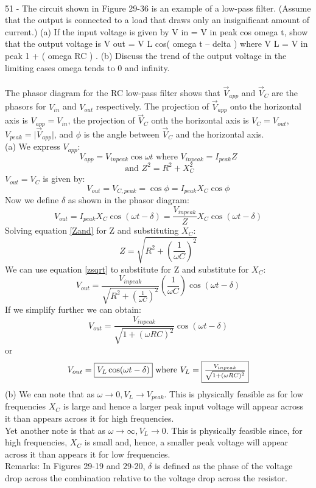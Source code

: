 \documentclass{report}
\begin{document}
\paragraph{}
51 - The circuit shown in Figure 29-36 is an example of a low-pass filter. (Assume that the output is connected to a load that draws only an insignificant amount of current.) (a) If the input voltage is given by V in = V in peak cos omega t, show that the output voltage is V out = V L cos( omega t – delta ) where V L = V in peak 1 + ( omega RC ) . (b) Discuss the trend of the output voltage in the limiting cases omega tends to 0 and infinity.\\
\\
The phasor diagram for the RC low-pass filter shows that $\vec V_{app}$ and $\vec V_C$ are the phasors for $V_{in}$ and $V_{out}$ respectively. The projection of $\vec V_{app}$ onto the horizontal axis is $V_{app} = V_{in}$, the projection of $\vec V_C$ onth the horizontal axis is $V_C = V_{out}$, $V_{peak} = \lvert \vec V_{app} \rvert$, and $\phi$ is the angle between $\vec V_C$ and the horizontal axis.\\
(a)
We express $V_{app}$:
$$V_{app} = V_{in peak} \cos \omega t \text{ where } V_{in peak} = I_{peak}Z$$
\begin{equation}\label{Zand}
  \text{ and } Z^2 = R^2 + X_C^2
\end{equation}
$V_{out} = V_C$ is given by:
$$V_{out} = V_{C,peak} = \cos \phi = I_{peak}X_C \cos \phi$$
Now we define $\delta$ as shown in the phasor diagram:
$$V_{out} = I_{peak}X_C \cos (\omega t - \delta) = \frac{V_{in peak}}{Z}X_C \cos (\omega t - \delta)$$
Solving equation \ref{Zand} for Z and substituting $X_C$:
\begin{equation}\label{zsqrt}
  Z = \sqrt{R^2 + \left( \frac{1}{\omega C} \right)^2}
\end{equation}
We can use equation \ref{zsqrt} to substitute for Z and substitute for $X_C$:
$$V_{out} = \frac{V_{in peak}}{\sqrt{R^2 + \left( \frac{1}{\omega C} \right)^2}} \left( \frac{1}{\omega C} \right) \cos (\omega t - \delta)$$
If we simplify further we can obtain:
$$V_{out} = \frac{V_{in peak}}{\sqrt{1 + (\omega RC)^2}} \cos (\omega t - \delta)$$
or
$$V_{out} = \fbox{$V_L \cos (\omega t - \delta)$} \text{ where } V_L = \fbox{$\frac{V_{in peak}}{\sqrt{1 + (\omega RC)^2}}$}$$
(b) We can note that as $\omega \rightarrow 0, V_L \rightarrow V_{peak}$. This is physically feasible as for low frequencies $X_C$ is large and hence a larger peak input voltage will appear across it than appears across it for high frequencies.\\
Yet another note is that as $\omega \rightarrow \infty, V_L \rightarrow 0$. This is physically feasible since, for high frequencies, $X_C$ is small and, hence, a smaller peak voltage will appear across it than appears it for low frequencies.\\
Remarks: In Figures 29-19 and 29-20, $\delta$ is defined as the phase of the
voltage drop across the combination relative to the voltage drop across
the resistor.
\end{document}
